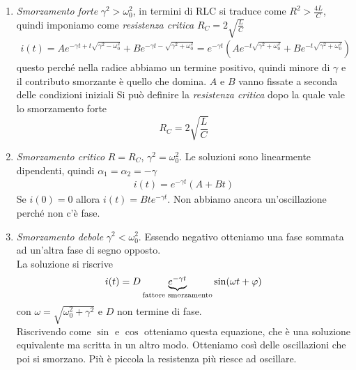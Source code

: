 \begin{enumerate}
	\item \textit{Smorzamento forte} $\gamma^2>\omega_0^2$, in termini di RLC si traduce come $R^2>\frac{4L}{C}$, quindi imponiamo come \textit{resistenza critica} $R_C=2\sqrt{\frac{L}{C}}$\\
	\begin{gather*}
		i(t)=Ae^{-\gamma t+t\sqrt{\gamma^2-\omega_0^2}} + Be^{-\gamma t -\sqrt{\gamma^2 +\omega_0^2}} 	= e^{-\gamma t}\left( Ae^{-t\sqrt{\gamma^2+\omega_0^2}} + Be^{-t\sqrt{\gamma^2+\omega_0^2}}\right)
	\end{gather*}
	questo perché nella radice abbiamo un termine positivo, quindi minore di $\gamma$ e il contributo smorzante è quello che domina.
	$A$ e $B$ vanno fissate a seconda delle condizioni iniziali
	Si può definire la \textit{resistenza critica} dopo la quale vale lo smorzamento forte
	\begin{equation*}
		R_C=2\sqrt{\frac{L}{C}}
	\end{equation*}
	\item \textit{Smorzamento critico} $R=R_C$, $\gamma^2=\omega_0^2$. Le soluzioni sono linearmente dipendenti, quindi $\alpha_1=\alpha_2=-\gamma$
	\begin{gather*}
		i(t)=e^{-\gamma t}(A+Bt)
	\end{gather*}
	Se $i(0)=0$ allora $i(t)=Bte^{-\gamma t}$. Non abbiamo ancora un'oscillazione perché non c'è fase.
	\item \textit{Smorzamento debole} $\gamma^2<\omega_0^2$. Essendo negativo otteniamo una fase sommata ad un'altra fase di segno opposto.\\
	La soluzione si riscrive 
	\begin{gather*}
		i(t)=D\underbrace{e^{-\gamma t}}_{\text{fattore smorzamento}} \sin(\omega t+\oldphi)
	\end{gather*}
	con $\omega=\sqrt{\omega_0^2+\gamma^2}$ e $D$ non termine di fase.\\
	Riscrivendo come $\sin$ e $\cos$ otteniamo questa equazione, che è una soluzione equivalente ma scritta in un altro modo. Otteniamo così delle oscillazioni che poi si smorzano. Più è piccola la resistenza più riesce ad oscillare.
\end{enumerate}


